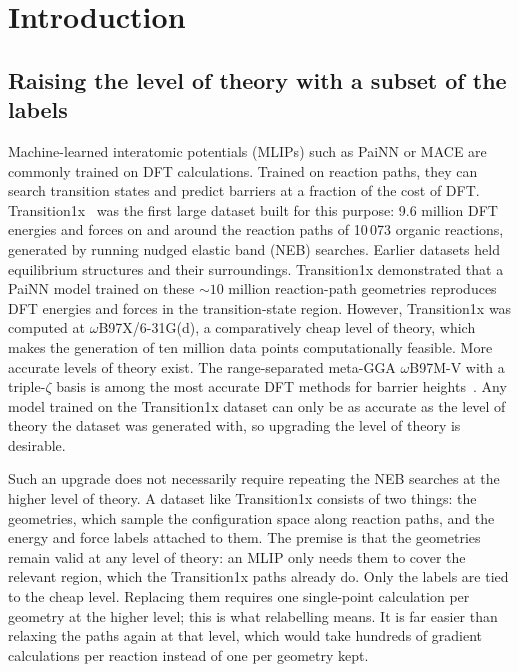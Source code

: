 \chapter{Introduction}
\label{ch:introduction}


\section{Raising the level of theory with a subset of the labels}

Machine-learned interatomic potentials (MLIPs) such as PaiNN or MACE
are commonly trained on DFT calculations. Trained on reaction paths,
they can search transition states and predict barriers at a fraction
of the cost of DFT. Transition1x~\cite{schreiner2022} was the first
large dataset built for this purpose: 9.6 million DFT energies and
forces on and around the reaction paths of 10\,073 organic reactions,
generated by running nudged elastic band (NEB) searches. Earlier
datasets held equilibrium structures and their surroundings.
Transition1x demonstrated that a PaiNN model trained on these
${\sim}10$ million reaction-path geometries reproduces DFT energies
and forces in the transition-state region. However,
Transition1x was computed at \mbox{$\omega$B97X/6-31G(d)}, a
comparatively cheap level of theory, which makes the generation of
ten million data points computationally feasible. More accurate
levels of theory exist. The range-separated
meta-GGA $\omega$B97M-V with a triple-$\zeta$ basis is among the most
accurate DFT methods for barrier heights~\cite{mardirossian2016,
najibi2018}. Any model trained on the Transition1x dataset can only
be as accurate as the level of theory the dataset was generated with,
so upgrading the level of theory is desirable.

Such an upgrade does not necessarily require repeating the NEB searches at the
higher level of theory. A dataset like Transition1x consists of two
things: the geometries, which sample the configuration space along
reaction paths, and the energy and force labels attached to them. The
premise is that the geometries remain valid at any level of theory:
an MLIP only needs them to cover the relevant region, which the
Transition1x paths already do. Only the labels are tied to the cheap
level. Replacing them requires one single-point calculation per geometry at
the higher level; this is what relabelling means. It is far easier
than relaxing the paths again at that level, which would take hundreds
of gradient calculations per reaction instead of one per geometry
kept.

